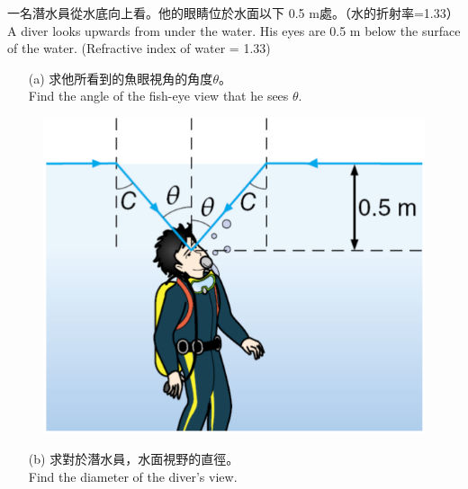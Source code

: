 \documentclass[beamer=true]{standalone}
\begin{document}
\begin{eg}
    一名潛水員從水底向上看。他的眼睛位於水面以下 0.5 m處。（水的折射率=1.33）\\A diver looks upwards from under the water. His eyes are 0.5 m below the surface of the water. (Refractive index of water = 1.33)
    \begin{itemize}
        \item [(a)] 求他所看到的魚眼視角的角度$\theta$。\\Find the angle of the fish-eye view that he sees $\theta$.
    \end{itemize}
    \begin{figure}
        \raggedleft
        \includegraphics[width=0.35\linewidth]{assets/d980udn34.png}
    \end{figure}

\end{eg}

\begin{eg}
    \begin{itemize}
        \item [(b)] 求對於潛水員，水面視野的直徑。\\Find the diameter of the diver's view.
    \end{itemize}
\end{eg}
\end{document}

